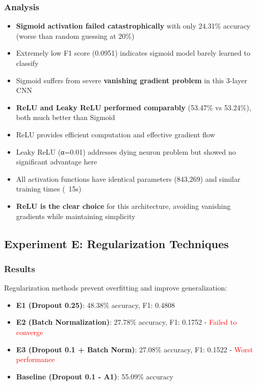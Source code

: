 \documentclass[12pt,a4paper]{article}
\begin{document}
\subsubsection{Analysis}
\begin{itemize}
    \item \textbf{Sigmoid activation failed catastrophically} with only 24.31\% accuracy (worse than random guessing at 20\%)
    \item Extremely low F1 score (0.0951) indicates sigmoid model barely learned to classify
    \item Sigmoid suffers from severe \textbf{vanishing gradient problem} in this 3-layer CNN
    \item \textbf{ReLU and Leaky ReLU performed comparably} (53.47\% vs 53.24\%), both much better than Sigmoid
    \item ReLU provides efficient computation and effective gradient flow
    \item Leaky ReLU (α=0.01) addresses dying neuron problem but showed no significant advantage here
    \item All activation functions have identical parameters (843,269) and similar training times (~15s)
    \item \textbf{ReLU is the clear choice} for this architecture, avoiding vanishing gradients while maintaining simplicity
\end{itemize}

\subsection{Experiment E: Regularization Techniques}

\subsubsection{Results}
Regularization methods prevent overfitting and improve generalization:

\begin{itemize}
    \item \textbf{E1 (Dropout 0.25)}: 48.38\% accuracy, F1: 0.4808
    \item \textbf{E2 (Batch Normalization)}: 27.78\% accuracy, F1: 0.1752 - \textcolor{red}{Failed to converge}
    \item \textbf{E3 (Dropout 0.1 + Batch Norm)}: 27.08\% accuracy, F1: 0.1522 - \textcolor{red}{Worst performance}
    \item \textbf{Baseline (Dropout 0.1 - A1)}: 55.09\% accuracy
\end{itemize}
\end{document}
